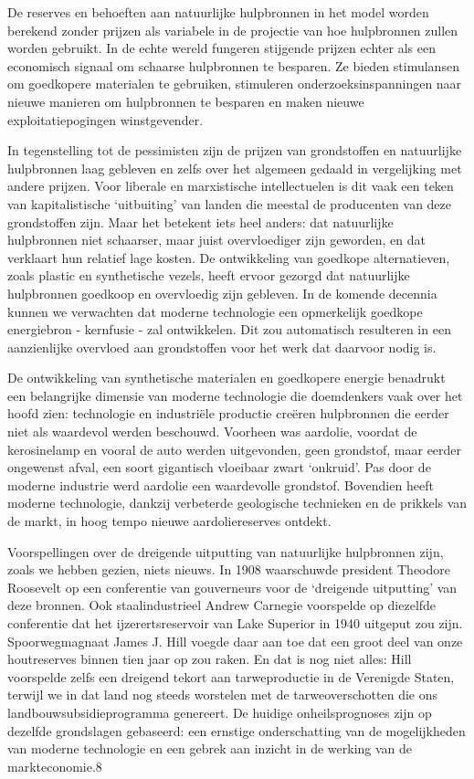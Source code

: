 \documentclass[
  a5paper,
  smalldemyvopaper,10pt,twoside,onecolumn,openright,extrafontsizes,hidelinks]{memoir}
\renewenvironment{quote}%
               {\list{}{\rightmargin=.6cm\leftmargin=.6cm}%
                \itshape \item[]}%
               {\endlist}
\begin{document}
\begin{quote}
De reserves en behoeften aan natuurlijke hulpbronnen in het model worden
berekend zonder prijzen als variabele in de projectie van hoe
hulpbronnen zullen worden gebruikt. In de echte wereld fungeren
stijgende prijzen echter als een economisch signaal om schaarse
hulpbronnen te besparen. Ze bieden stimulansen om goedkopere materialen
te gebruiken, stimuleren onderzoeksinspanningen naar nieuwe manieren om
hulpbronnen te besparen en maken nieuwe exploitatiepogingen
winstgevender.
\end{quote}

In tegenstelling tot de pessimisten zijn de prijzen van grondstoffen en
natuurlijke hulpbronnen laag gebleven en zelfs over het algemeen gedaald
in vergelijking met andere prijzen. Voor liberale en marxistische
intellectuelen is dit vaak een teken van kapitalistische `uitbuiting'
van landen die meestal de producenten van deze grondstoffen zijn. Maar
het betekent iets heel anders: dat natuurlijke hulpbronnen niet
schaarser, maar juist overvloediger zijn geworden, en dat verklaart hun
relatief lage kosten. De ontwikkeling van goedkope alternatieven, zoals
plastic en synthetische vezels, heeft ervoor gezorgd dat natuurlijke
hulpbronnen goedkoop en overvloedig zijn gebleven. In de komende
decennia kunnen we verwachten dat moderne technologie een opmerkelijk
goedkope energiebron - kernfusie - zal ontwikkelen. Dit zou automatisch
resulteren in een aanzienlijke overvloed aan grondstoffen voor het werk
dat daarvoor nodig is.

De ontwikkeling van synthetische materialen en goedkopere energie
benadrukt een belangrijke dimensie van moderne technologie die
doemdenkers vaak over het hoofd zien: technologie en industriële
productie creëren hulpbronnen die eerder niet als waardevol werden
beschouwd. Voorheen was aardolie, voordat de kerosinelamp en vooral de
auto werden uitgevonden, geen grondstof, maar eerder ongewenst afval,
een soort gigantisch vloeibaar zwart `onkruid'. Pas door de moderne
industrie werd aardolie een waardevolle grondstof. Bovendien heeft
moderne technologie, dankzij verbeterde geologische technieken en de
prikkels van de markt, in hoog tempo nieuwe aardoliereserves ontdekt.

Voorspellingen over de dreigende uitputting van natuurlijke hulpbronnen
zijn, zoals we hebben gezien, niets nieuws. In 1908 waarschuwde
president Theodore Roosevelt op een conferentie van gouverneurs voor de
`dreigende uitputting' van deze bronnen. Ook staalindustrieel Andrew
Carnegie voorspelde op diezelfde conferentie dat het ijzerertsreservoir
van Lake Superior in 1940 uitgeput zou zijn. Spoorwegmagnaat James J.
Hill voegde daar aan toe dat een groot deel van onze houtreserves binnen
tien jaar op zou raken. En dat is nog niet alles: Hill voorspelde zelfs
een dreigend tekort aan tarweproductie in de Verenigde Staten, terwijl
we in dat land nog steeds worstelen met de tarweoverschotten die ons
landbouwsubsidieprogramma genereert. De huidige onheilsprognoses zijn op
dezelfde grondslagen gebaseerd: een ernstige onderschatting van de
mogelijkheden van moderne technologie en een gebrek aan inzicht in de
werking van de markteconomie.8
\end{document}
